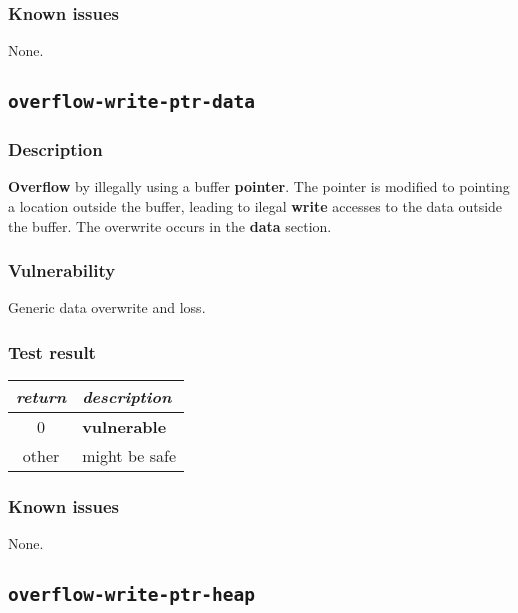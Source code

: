\documentclass[a4paper]{book}
\begin{document}
\subsubsection{Known issues}

None.

\newpage

\subsection{\texttt{overflow-write-ptr-data}}\label{test-overflow-write-ptr-data}

\subsubsection{Description}

\textbf{Overflow} by illegally using a buffer \textbf{pointer}.
The pointer is modified to pointing a location outside the buffer,
leading to ilegal \textbf{write} accesses to the data outside the buffer.
The overwrite occurs in the \textbf{data} section.

\subsubsection{Vulnerability}
Generic data overwrite and loss.

\subsubsection{Test result}

\begin{tabular}{cl}
  \toprule
  \emph{return}  & \emph{description} \\
  \midrule
  0              & \textbf{vulnerable} \\
  other          & might be safe \\
  \bottomrule
\end{tabular}

\subsubsection{Known issues}

None.

\newpage

\subsection{\texttt{overflow-write-ptr-heap}}\label{test-overflow-write-ptr-heap}
\end{document}
